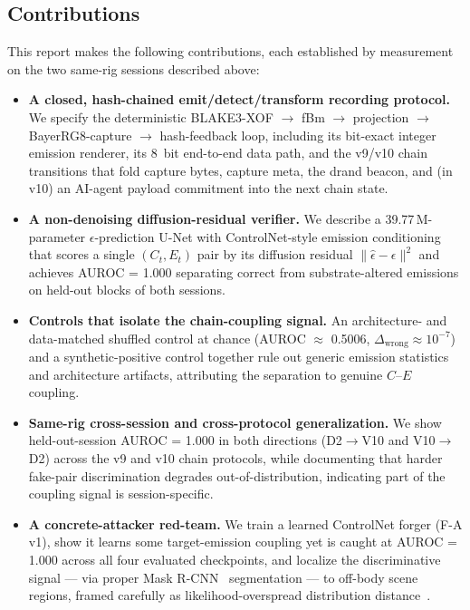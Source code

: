 \subsection{Contributions}

This report makes the following contributions, each established by measurement on the two same-rig sessions described above:

\begin{itemize}
  \item \textbf{A closed, hash-chained emit/detect/transform recording protocol.} We specify the deterministic BLAKE3-XOF $\to$ fBm $\to$ projection $\to$ BayerRG8-capture $\to$ hash-feedback loop, including its bit-exact integer emission renderer, its \SI{8}{bit} end-to-end data path, and the v9/v10 chain transitions that fold capture bytes, capture meta, the drand beacon, and (in v10) an AI-agent payload commitment into the next chain state.

  \item \textbf{A non-denoising diffusion-residual verifier.} We describe a \num{39.77}\,M-parameter $\epsilon$-prediction U-Net with ControlNet-style emission conditioning that scores a single $(C_t, E_t)$ pair by its diffusion residual $\lVert \hat{\epsilon}-\epsilon\rVert^2$ and achieves AUROC = 1.000 separating correct from substrate-altered emissions on held-out blocks of both sessions.

  \item \textbf{Controls that isolate the chain-coupling signal.} An architecture- and data-matched shuffled control at chance (AUROC $\approx$ 0.5006, $\Delta_{\text{wrong}} \approx 10^{-7}$) and a synthetic-positive control together rule out generic emission statistics and architecture artifacts, attributing the separation to genuine $C$--$E$ coupling.

  \item \textbf{Same-rig cross-session and cross-protocol generalization.} We show held-out-session AUROC = 1.000 in both directions (D2$\to$V10 and V10$\to$D2) across the v9 and v10 chain protocols, while documenting that harder fake-pair discrimination degrades out-of-distribution, indicating part of the coupling signal is session-specific.

  \item \textbf{A concrete-attacker red-team.} We train a learned ControlNet forger (F-A v1), show it learns some target-emission coupling yet is caught at AUROC = 1.000 across all four evaluated checkpoints, and localize the discriminative signal --- via proper Mask R-CNN~\cite{he2017maskrcnn} segmentation --- to off-body scene regions, framed carefully as likelihood-overspread distribution distance~\cite{nalisnick2019}.


\end{itemize}
